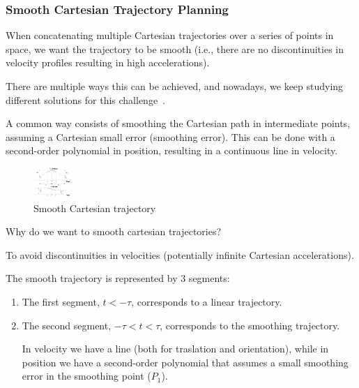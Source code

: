 \documentclass[10pt, aspectratio=169]{beamer}
\theoremstyle{remark}
\theoremstyle{definition}
\begin{document}
\begin{frame}[allowframebreaks]
\frametitle{Smooth Cartesian Trajectory Planning}

When concatenating multiple Cartesian trajectories over a series of points in space, we want the trajectory to be smooth (i.e., there are no discontinuities in velocity profiles resulting in high accelerations). 

There are multiple ways this can be achieved, and  nowadays, we keep studying different solutions for this challenge~\cite{tagliavini2023smooth}.

A common way consists of smoothing the Cartesian path in intermediate points, assuming a Cartesian small error (smoothing error). This can be done with a second-order polynomial in position, resulting in a continuous line in velocity.

\framebreak

\begin{figure}
    \centering
    \includegraphics[width=0.5\linewidth]{images/smooth_pos_vel.pdf}
    \caption{Smooth Cartesian trajectory}
    \label{fig:smooth_cartesian_trajectory}
\end{figure}{}

\framebreak

\textcolor{uma_blue_light}{Why do we want to smooth cartesian trajectories?}

To avoid discontinuities in velocities (potentially infinite Cartesian accelerations).

The smooth trajectory is represented by 3 segments:

\begin{enumerate}
    \item The first segment, $t < -\tau$, corresponds to a linear trajectory.
    \item The second segment, $-\tau < t < \tau$, corresponds to the smoothing trajectory. 
    
    In velocity we have a line (both for traslation and orientation), while in position we have a second-order polynomial that assumes a small smoothing error in the smoothing point ($P_1$). 
    

\end{enumerate}
\end{frame}
\end{document}
